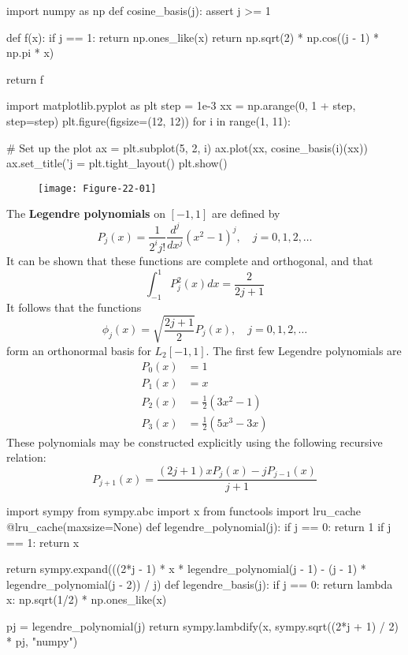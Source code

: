 \begin{python}
import numpy as np
def cosine_basis(j):
    assert j >= 1
    
    def f(x):
        if j == 1:
            return np.ones_like(x)   
        return np.sqrt(2) * np.cos((j - 1) * np.pi * x)
    
    return f
\end{python}

\begin{python}
import matplotlib.pyplot as plt
step = 1e-3
xx = np.arange(0, 1 + step, step=step)
plt.figure(figsize=(12, 12))
for i in range(1, 11):
    
    # Set up the plot
    ax = plt.subplot(5, 2, i)
    ax.plot(xx, cosine_basis(i)(xx))
    ax.set_title('j = %
plt.tight_layout()
plt.show()
\end{python}

\begin{figure}[H]
\centering
\texttt{[image: Figure-22-01]}
\end{figure}

The \textbf{Legendre polynomials} on \([-1, 1]\) are defined by
\[
P_{j}(x) = \frac{1}{2^{i} j!} \frac{d^{j}}{dx^{j}} (x^{2} - 1)^{j}, \quad j = 0, 1, 2, \dots
\]
It can be shown that these functions are complete and orthogonal, and
that
\[
\int_{-1}^{1} P_{j}^{2}(x) dx = \frac{2}{2j + 1}
\]
It follows that the functions
\[
\phi_{j}(x) = \sqrt{\frac{2j + 1}{2}}P_{j}(x), \quad j = 0, 1, 2, \dots
\]
form an orthonormal basis for \(L_{2}[-1, 1]\). The first few Legendre
polynomials are
\begin{align*}
P_{0}(x) &= 1 \\
P_{1}(x) &= x \\
P_{2}(x) &= \frac{1}{2}\left( 3x^{2} - 1 \right) \\
P_{3}(x) &= \frac{1}{2}\left( 5x^{3} - 3x \right)
\end{align*}
These polynomials may be constructed explicitly using the following
recursive relation:
\[
P_{j+1}(x) = \frac{(2j + 1) x P_{j}(x) - j P_{j - 1}(x)}{j + 1}
\]

\begin{python}
import sympy
from sympy.abc import x
from functools import lru_cache
@lru_cache(maxsize=None)
def legendre_polynomial(j):
    if j == 0:
        return 1
    if j == 1:
        return x
    
    return sympy.expand(((2*j - 1) * x * legendre_polynomial(j - 1) - (j - 1) * legendre_polynomial(j - 2)) / j)
def legendre_basis(j):
    if j == 0:
        return lambda x: np.sqrt(1/2) * np.ones_like(x)
    
    pj = legendre_polynomial(j)
    return sympy.lambdify(x, sympy.sqrt((2*j + 1) / 2) * pj, "numpy")
\end{python}

